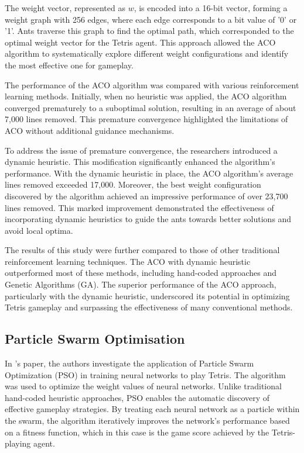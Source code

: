 \documentclass[a4paper, 12pt]{extreport}
\begin{document}
	The weight vector, represented as $w$, is encoded into a 16-bit vector, forming a weight graph with 256 edges, where each edge corresponds to a bit value of '0' or '1'. Ants traverse this graph to find the optimal path, which corresponded to the optimal weight vector for the Tetris agent. This approach allowed the ACO algorithm to systematically explore different weight configurations and identify the most effective one for gameplay.
	
	The performance of the ACO algorithm was compared with various reinforcement learning methods. Initially, when no heuristic was applied, the ACO algorithm converged prematurely to a suboptimal solution, resulting in an average of about 7,000 lines removed. This premature convergence highlighted the limitations of ACO without additional guidance mechanisms.
	
	To address the issue of premature convergence, the researchers introduced a dynamic heuristic. This modification significantly enhanced the algorithm's performance. With the dynamic heuristic in place, the ACO algorithm's average lines removed exceeded 17,000. Moreover, the best weight configuration discovered by the algorithm achieved an impressive performance of over 23,700 lines removed. This marked improvement demonstrated the effectiveness of incorporating dynamic heuristics to guide the ants towards better solutions and avoid local optima.
	
	The results of this study were further compared to those of other traditional reinforcement learning techniques. The ACO with dynamic heuristic outperformed most of these methods, including hand-coded approaches and Genetic Algorithms (GA). The superior performance of the ACO approach, particularly with the dynamic heuristic, underscored its potential in optimizing Tetris gameplay and surpassing the effectiveness of many conventional methods.
	
	\subsection{Particle Swarm Optimisation}
	
	In \citeauthor{swarm-tetris}'s \cite{swarm-tetris} paper, the authors investigate the application of Particle Swarm Optimization (PSO) in training neural networks to play Tetris. The algorithm was used to optimize the weight values of neural networks. Unlike traditional hand-coded heuristic approaches, PSO enables the automatic discovery of effective gameplay strategies. By treating each neural network as a particle within the swarm, the algorithm iteratively improves the network's performance based on a fitness function, which in this case is the game score achieved by the Tetris-playing agent.
	
\end{document}

